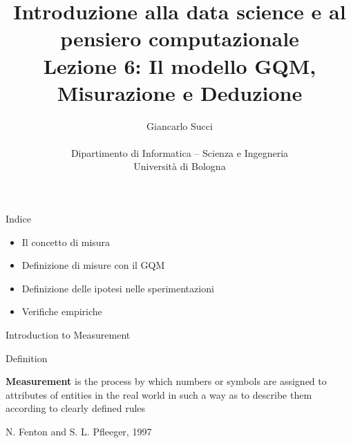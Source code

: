 \documentclass{beamer}
\title[L02]{Introduzione alla data science e al pensiero computazionale\\
Lezione 6: Il modello GQM, Misurazione e Deduzione} %
\author[{\tiny Giancarlo Succi }]{Giancarlo Succi\\\\ Dipartimento di Informatica -- Scienza e Ingegneria\\Universit\`{a} di Bologna\\
\bftt{g.succi@unibo.it}
} %
\institute[unibo] %
\date{} %
\begin{document}
\begin{frame}
\titlepage %

\end{frame}




\begin{frame}
{\centerline{Indice}}
\begin{itemize}
    \item Il concetto di misura
    \item Definizione di misure con il GQM
    \item Definizione delle ipotesi nelle sperimentazioni
    \item Verifiche empiriche
\end{itemize} 
\end{frame}


\begin{frame}{\centerline{}}

\begin{center}
{\Large
Introduction to Measurement \\
}
\end{center}
\end{frame}



\begin{frame}{\centerline{Definition}}


\textbf{Measurement} is the process by which numbers or symbols are assigned to attributes of entities in the real world in such a way as to describe them according to clearly defined rules
\begin{flushright}
N. Fenton and S. L. Pfleeger, 1997
\end{flushright}

\end{frame}
\end{document}

